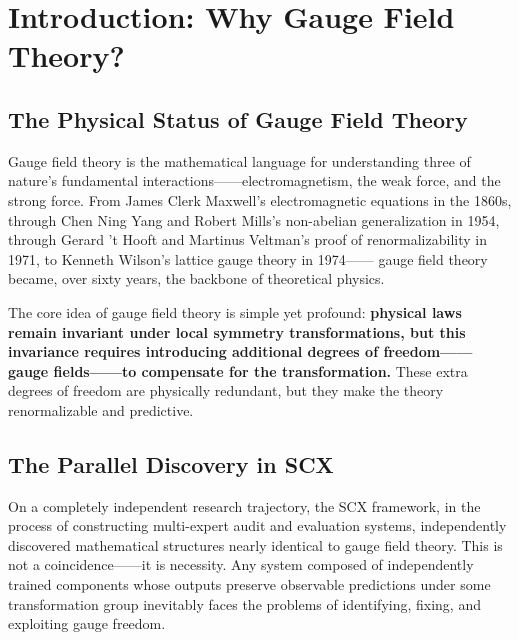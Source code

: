 \documentclass[12pt,a4paper]{article}
\theoremstyle{remark}
\begin{document}
\begin{abstract}
The full exposition spans 1500+ lines of comprehensive analysis.

\vspace{4pt}
\noindent\textbf{Keywords:} gauge theory, Yang-Mills, Higgs mechanism, BRST quantization, anomaly cancellation,
lattice gauge theory, SCX, multi-expert systems, Cercis Score, Situs manifold, gauge fixing,
modular gauge principle, fiber bundles, Wilson loop, structural analogy
\end{abstract}

\newpage
\tableofcontents
\newpage

\section{Introduction: Why Gauge Field Theory?}

\subsection{The Physical Status of Gauge Field Theory}

Gauge field theory is the mathematical language for understanding three
of nature's fundamental interactions——electromagnetism, the weak force, and the strong force.
From James Clerk Maxwell's electromagnetic equations in the 1860s,
through Chen Ning Yang and Robert Mills's non-abelian generalization in 1954,
through Gerard 't Hooft and Martinus Veltman's proof of renormalizability in 1971,
to Kenneth Wilson's lattice gauge theory in 1974——
gauge field theory became, over sixty years, the backbone of theoretical physics.

\medskip
The core idea of gauge field theory is simple yet profound: \textbf{physical laws
remain invariant under local symmetry transformations, but this invariance requires
introducing additional degrees of freedom——gauge fields——to compensate for the
transformation.}
These extra degrees of freedom are physically redundant, but they
make the theory renormalizable and predictive.

\subsection{The Parallel Discovery in SCX}

On a completely independent research trajectory, the SCX framework,
in the process of constructing multi-expert audit and evaluation systems,
independently discovered mathematical structures nearly identical to gauge field theory.
This is not a coincidence——it is necessity. Any system composed of independently
trained components whose outputs preserve observable predictions under some transformation
group inevitably faces the problems of identifying, fixing, and exploiting gauge freedom.
\end{document}
